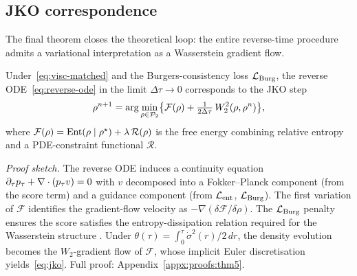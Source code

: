 \subsection{{JKO} correspondence}
\label{sec:theory:jko}

The final theorem closes the theoretical loop: the entire reverse-time procedure admits a variational interpretation as a Wasserstein gradient flow.

\begin{theorem}
\label{thm:jko}
Under~\eqref{eq:visc-matched} and the Burgers-consistency loss $\mathcal{L}_{\mathrm{Burg}}$, the reverse {ODE}~\eqref{eq:reverse-ode} in the limit $\Delta\tau\to0$ corresponds to the {JKO} step
\begin{equation}
  \label{eq:jko}
  \rho^{n+1} = \arg\min_{\rho\in\mathcal{P}_{2}}
    \bigl\{ \mathcal{F}(\rho) + \tfrac{1}{2\Delta\tau}\,W_{2}^{2}(\rho,\rho^{n}) \bigr\},
\end{equation}
where $\mathcal{F}(\rho)=\mathrm{Ent}(\rho\mid\rho^{\star})+\lambda\,\mathcal{R}(\rho)$ is the free energy combining relative entropy and a {PDE}-constraint functional $\mathcal{R}$.
\end{theorem}

\textit{Proof sketch.} The reverse {ODE} induces a continuity equation $\partial_{\tau}p_{\tau}+\nabla\cdot(p_{\tau} v)=0$ with $v$ decomposed into a Fokker--Planck component (from the score term) and a guidance component (from $\mathcal{L}_{\mathrm{ent}}$, $\mathcal{L}_{\mathrm{Burg}}$). The first variation of $\mathcal{F}$ identifies the gradient-flow velocity as $-\nabla(\delta\mathcal{F}/\delta\rho)$. The $\mathcal{L}_{\mathrm{Burg}}$ penalty ensures the score satisfies the entropy-dissipation relation required for the Wasserstein structure \citep{jko1998}. Under $\theta(\tau)=\int_{0}^{\tau}\dot\sigma^{2}(r)/2\,dr$, the density evolution becomes the $W_{2}$-gradient flow of $\mathcal{F}$, whose implicit Euler discretisation yields~\eqref{eq:jko}. Full proof: Appendix~\ref{appx:proofs:thm5}.
